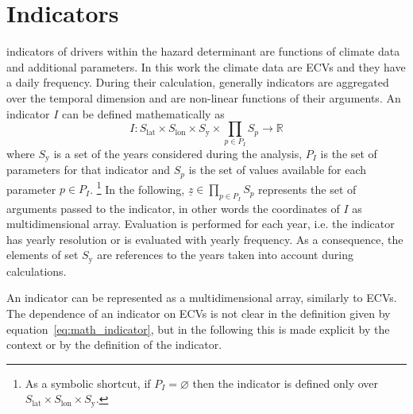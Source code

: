 \section{Indicators}
\label{sec:Indicators}
\Glspl{indicator} of \glspl{driver} within the \gls{hazard} \gls{determinant} are functions of climate data and additional parameters. In this work the climate data are \glspl{ECV} and they have a daily frequency.
During their calculation, generally \glspl{indicator} are aggregated over the temporal dimension and are non-linear functions of their arguments.
An \gls{indicator} $I$ can be defined mathematically as
\begin{equation}
  \label{eq:math_indicator}
  I : S_\text{lat} \times S_\text{lon} \times S_\text{y} \times \prod_{p \in P_I} S_p \to \mathbb{R}
\end{equation}
where $S_\text{y}$ is a set of the years considered during the analysis, $P_I$ is the set of parameters for that indicator and $S_p$ is the set of values available for each parameter $p \in P_I$.%
\footnote{As a symbolic shortcut, if $P_I = \varnothing$ then the indicator is defined only over $S_\text{lat} \times S_\text{lon} \times S_\text{y}$.}
In the following, $\underline{z} \in \prod_{p \in P_I} S_p$ represents the set of arguments passed to the \gls{indicator}, in other words the coordinates of $I$ as multidimensional array.
Evaluation is performed for each year, i.e. the \gls{indicator} has yearly resolution or is evaluated with yearly frequency. As a consequence, the elements of set $S_\text{y}$ are references to the years taken into account during calculations.

An \gls{indicator} can be represented as a multidimensional array, similarly to \glspl{ECV}.
The dependence of an \gls{indicator} on \glspl{ECV} is not clear in the definition given by equation~\eqref{eq:math_indicator}, but in the following this is made explicit by the context or by the definition of the \gls{indicator}.

